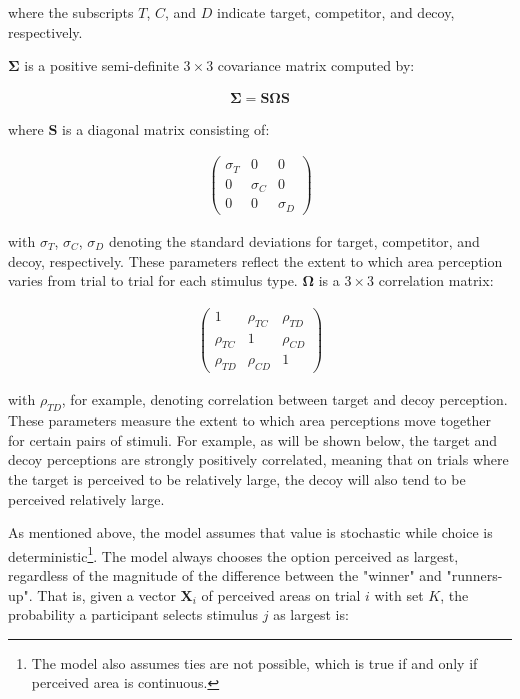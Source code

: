 where the subscripts $T$, $C$, and $D$ indicate target, competitor, and decoy, respectively.

$\boldsymbol{\Sigma}$ is a positive semi-definite $3 \times 3$ covariance matrix computed by:

\begin{align}
   \boldsymbol{\Sigma}=\bm{S}\boldsymbol{\Omega}\bm{S}
   \label{eqn:Sigma}
\end{align}

where $\bm{S}$ is a diagonal matrix consisting of: 

\begin{align}
   \begin{pmatrix}
      \sigma_{T} & 0 & 0 \\
      0 & \sigma_{C} & 0 \\
      0 & 0 & \sigma_{D} 
   \end{pmatrix}
\label{eqn:S}
\end{align}

with $\sigma_{T}$, $\sigma_{C}$, $\sigma_{D}$ denoting the standard deviations for target, competitor, and decoy, respectively. These parameters reflect the extent to which area perception varies from trial to trial for each stimulus type. $\boldsymbol{\Omega}$ is a $3\times3$ correlation matrix:

\begin{align}
   \begin{pmatrix}
      1 & \rho_{TC} & \rho_{TD} \\
      \rho_{TC} & 1 & \rho_{CD} \\
      \rho_{TD} & \rho_{CD} & 1 
   \end{pmatrix}
\label{eqn:O}
\end{align}

with $\rho_{TD}$, for example, denoting correlation between target and decoy perception. These parameters measure the extent to which area perceptions move together for certain pairs of stimuli. For example, as will be shown below, the target and decoy perceptions are strongly positively correlated, meaning that on trials where the target is perceived to be relatively large, the decoy will also tend to be perceived relatively large.

As mentioned above, the model assumes that value is stochastic while choice is deterministic\footnote{The model also assumes ties are not possible, which is true if and only if perceived area is continuous.}. The model always chooses the option perceived as largest, regardless of the magnitude of the difference between the "winner" and "runners-up". That is, given a vector $\mathbf{X}_i$ of perceived areas on trial $i$ with set $K$, the probability a participant selects stimulus $j$ as largest is:

